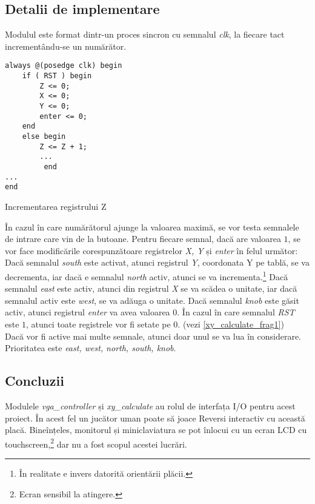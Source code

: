\documentclass[12pt,twoside,a4paper,fleqn]{book}
\theoremstyle{definition}
\begin{document}
\subsection{Detalii de implementare}
Modulul este format dintr-un proces sincron cu semnalul \emph{clk}, la fiecare tact incrementându-se un numărător.
\begin{fragmentsursa}
\begin{scriptsize}
\begin{verbatim}
always @(posedge clk) begin
    if ( RST ) begin
        Z <= 0;
        X <= 0;
        Y <= 0;
        enter <= 0;
    end 
    else begin
        Z <= Z + 1;
        ...
         end
...
end         
\end{verbatim}
\end{scriptsize}
\caption{Incrementarea registrului Z}
\label{xy_calculate_frag1}
\end{fragmentsursa}
În cazul în care numărătorul ajunge la valoarea maximă, se vor testa semnalele de intrare care vin de la butoane. Pentru fiecare semnal, dacă are valoarea $1$, se vor face modificările corespunzătoare registrelor \emph{X, Y} și \emph{enter} în felul următor: Dacă semnalul \emph{south} este activat, atunci registrul \emph{Y}, coordonata Y pe tablă, se va decrementa, iar dacă e semnalul \emph{north} activ, atunci se va incrementa.\footnote{În realitate e invers datorită orientării plăcii.} Dacă semnalul \emph{east} este activ, atunci din registrul \emph{X} se va scădea o unitate, iar dacă semnalul activ este \emph{west}, se va adăuga o unitate. Dacă semnalul \emph{knob} este găsit activ, atunci registrul \emph{enter} va avea valoarea $0$. În cazul în care semnalul \emph{RST} este $1$, atunci toate registrele vor fi setate pe $0$. (vezi \ref{xy_calculate_frag1})\\
Dacă vor fi active mai multe semnale, atunci doar unul se va lua în considerare. Prioritatea este \emph{east, west, north, south, knob}.
\subsection{Concluzii}
Modulele \emph{vga\_controller} și \emph{xy\_calculate} au rolul de interfața I/O pentru acest proiect. În acest fel un jucător uman poate să joace Reversi interactiv cu această placă. Bineînțeles, monitorul și miniclaviatura se pot înlocui cu un ecran LCD cu touchscreen,\footnote{Ecran sensibil la atingere.} dar nu a fost scopul acestei lucrări.
\end{document}
